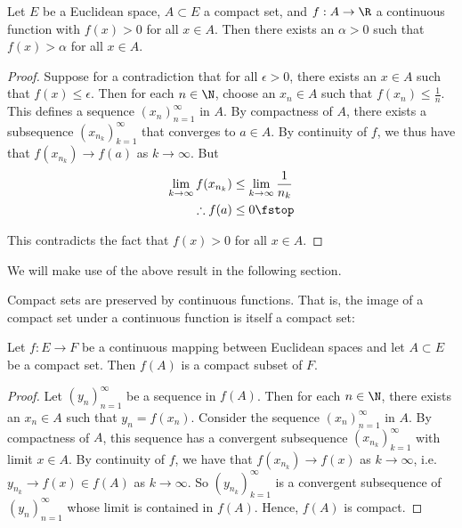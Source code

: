  \begin{proposition}
   \label{thm:posfunc}
   Let \( E \) be a Euclidean space, \( A\subset E \) a compact set, and \( f:A\to\R \) a continuous function with \( f(x)>0 \) for all \( x\in A \). Then there exists an \( \alpha>0 \) such that \( f(x)>\alpha \) for all \( x\in A \).
 \end{proposition}
 \begin{proof}
   Suppose for a contradiction that for all \( \epsilon>0 \), there exists an \( x\in A \) such that \( f(x)\leq\epsilon \). Then for each \( n\in\N \), choose an \( x_n\in A \) such that \( f(x_n)\leq \frac{1}{n} \). This defines a sequence \( (x_n)_{n=1}^\infty \) in \( A \). By compactness of \( A \), there exists a subsequence \( (x_{n_k})_{k=1}^\infty \) that converges to \( a\in A \). By continuity of \( f \), we thus have that \( f(x_{n_k})\to f(a) \) as \( k\to\infty \). But
   \begin{align*}
     \lim_{k\to\infty}f(x_{n_k})&\leq \lim_{k\to\infty}\frac{1}{n_k}\\
     \therefore f(a)&\leq 0\fstop
   \end{align*}

   This contradicts the fact that \( f(x)>0 \) for all \( x\in A \).
 \end{proof}

 We will make use of the above result in the following section.

 \vspace{3mm}

 Compact sets are preserved by continuous functions. That is, the image of a compact set under a continuous function is itself a compact set:

 \begin{proposition}
   \label{thm:cptimage}
   Let \( f:E\to F \) be a continuous mapping between Euclidean spaces and let \( A\subset E \) be a compact set. Then \( f(A) \) is a compact subset of \( F \).
 \end{proposition}
 \begin{proof}
   Let \( (y_n)_{n=1}^\infty \) be a sequence in \( f(A) \). Then for each \( n\in\N \), there exists an \( x_n\in A \) such that \( y_n=f(x_n) \). Consider the sequence \( (x_n)_{n=1}^\infty \) in \( A \). By compactness of \( A \), this sequence has a convergent subsequence \( (x_{n_k})_{k=1}^\infty \) with limit \( x\in A \). By continuity of \( f \), we have that \( f(x_{n_k})\to f(x) \) as \( k\to\infty \), i.e.\ \( y_{n_k}\to f(x)\in f(A) \) as \( k\to\infty \). So \( (y_{n_k})_{k=1}^\infty \) is a convergent subsequence of \( (y_n)_{n=1}^\infty \) whose limit is contained in \( f(A) \). Hence, \( f(A) \) is compact.
 \end{proof}

